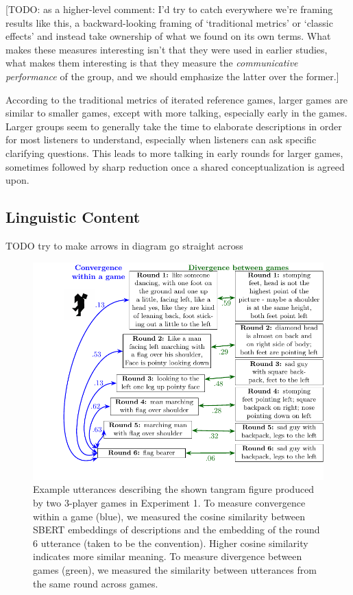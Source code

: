 \documentclass[
  english,
  a4paper,
]{article}
\begin{document}
{[}TODO: as a higher-level comment: I'd try to catch everywhere we're framing results like this, a backward-looking framing of `traditional metrics' or `classic effects' and instead take ownership of what we found on its own terms. What makes these measures interesting isn't that they were used in earlier studies, what makes them interesting is that they measure the \emph{communicative performance} of the group, and we should emphasize the latter over the former.{]}

According to the traditional metrics of iterated reference games, larger games are similar to smaller games, except with more talking, especially early in the games. Larger groups seem to generally take the time to elaborate descriptions in order for most listeners to understand, especially when listeners can ask specific clarifying questions. This leads to more talking in early rounds for larger games, sometimes followed by sharp reduction once a shared conceptualization is agreed upon.

\hypertarget{linguistic-content}{%
\subsection{Linguistic Content}\label{linguistic-content}}

TODO try to make arrows in diagram go straight across

\begin{figure}[t!]

{\centering \includegraphics[width=1\linewidth]{sbert} 

}

\caption{Example utterances describing the shown tangram figure produced by two 3-player games in Experiment 1. To measure convergence within a game (blue), we measured the cosine similarity between SBERT embeddings of descriptions and the embedding of the round 6 utterance (taken to be the convention). Higher cosine similarity indicates more similar meaning. To measure divergence between games (green), we measured the similarity between utterances from the same round across games.}\label{fig:sbert-diagram}
\end{figure}
\end{document}
